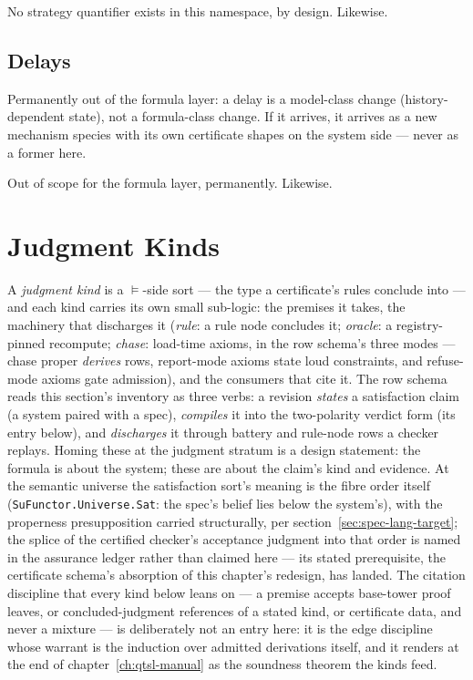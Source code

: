 No strategy quantifier exists in this namespace, by design.
Likewise.

\subsection{Delays}
\label{sec:spec-lang-fdelay}


Permanently out of the formula layer: a delay is a model-class change
(history-dependent state), not a formula-class change. If it arrives,
it arrives as a new mechanism species with its own certificate
shapes on the system side --- never as a former here.

Out of scope for the formula layer, permanently.
Likewise.

\section{Judgment Kinds}
\label{sec:spec-lang-judgments}

A \emph{judgment kind} is a $\vDash$-side sort --- the type a
certificate's rules conclude into --- and each kind carries its own
small sub-logic: the premises it takes, the machinery that discharges
it (\emph{rule}: a rule node concludes it; \emph{oracle}: a
registry-pinned recompute; \emph{chase}: load-time axioms, in the
row schema's three modes --- chase proper \emph{derives} rows,
report-mode axioms state loud constraints, and refuse-mode axioms
gate admission), and the consumers that cite it. The row schema
reads this section's inventory as three verbs: a revision
\emph{states} a satisfaction claim (a system paired with a spec),
\emph{compiles} it into the two-polarity verdict form (its entry
below), and \emph{discharges} it through battery and rule-node rows
a checker replays. Homing these
at the judgment stratum is a design statement: the formula is about
the system; these are about the claim's kind and evidence. At the
semantic universe the satisfaction sort's meaning is the fibre order
itself (\texttt{SuFunctor.Universe.Sat}: the spec's belief lies
below the system's), with the properness presupposition carried
structurally, per section~\ref{sec:spec-lang-target}; the splice of
the certified checker's acceptance judgment into that order is named
in the assurance ledger rather than claimed here --- its stated
prerequisite, the certificate schema's absorption of this chapter's
redesign, has landed. The citation discipline that every kind below leans on
--- a premise accepts base-tower proof leaves, or
concluded-judgment references of a stated kind, or certificate data,
and never a mixture --- is deliberately not an entry here: it is the
edge discipline whose warrant is the induction over admitted
derivations itself, and it renders at the end of
chapter~\ref{ch:qtsl-manual} as the soundness theorem the kinds
feed.


